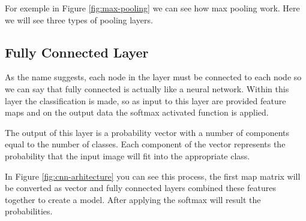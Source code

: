 For exemple in Figure \ref{fig:max-pooling} we can see how max pooling work.
Here we will see three types of pooling layers.



\subsection{Fully Connected Layer}

As the name suggests, each node in the layer must be connected to 
each node so we can say that fully connected is actually like a neural network.
Within this layer the classification is made, so as input to this layer are provided feature maps 
and on the output data the softmax activated function is applied.

The output of this layer is a probability vector with a number of components equal to the number of classes.
Each component of the vector represents
the probability that the input image will fit into the appropriate class.

In Figure \ref{fig:cnn-arhitecture} you can see this process, 
the first map matrix will be converted as vector and fully connected layers combined these features together to create a model.
After applying the softmax will result the probabilities. 